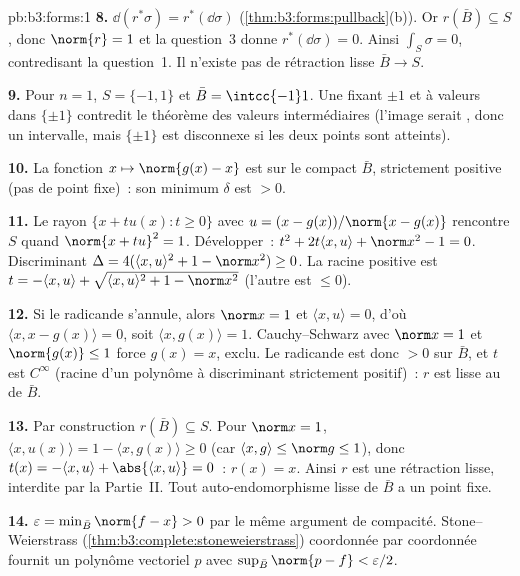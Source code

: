 \begin{solution}{pb:b3:forms:1}
\textbf{8.} $\dd(r^*\sigma) = r^*(\dd\sigma)$
(\cref{thm:b3:forms:pullback}(b)). Or $r(\bar B) \subseteq
S$, donc $\norm{r} = 1$ et la question~3 donne
$r^*(\dd\sigma) = 0$. Ainsi $\int_S\sigma = 0$, contredisant
la question~1. Il n'existe pas de rétraction lisse $\bar B
\to S$.

\textbf{9.} Pour $n = 1$, $S = \{-1,1\}$ et $\bar B =
\intcc{-1}1$. Une  fixant $\pm1$ et à
valeurs dans $\{\pm1\}$ contredit le théorème des valeurs
intermédiaires (l'image serait , donc un intervalle,
mais $\{\pm1\}$ est disconnexe si les deux points sont
atteints).

\textbf{10.} La fonction $x \mapsto \norm{g(x) - x}$ est
 sur le compact $\bar B$, strictement positive (pas
de point fixe)~: son minimum $\delta$ est $> 0$.

\textbf{11.} Le rayon $\{x + t u(x) : t \geq 0\}$ avec $u
= (x-g(x))/\norm{x-g(x)}$ rencontre $S$ quand $\norm{x +
tu}^2 = 1$. Développer~: $t^2 + 2t\langle x,u\rangle +
\norm x^2 - 1 = 0$. Discriminant $\Delta = 4(\langle x,u
\rangle^2 + 1 - \norm x^2) \geq 0$. La racine positive est
$t = -\langle x,u\rangle + \sqrt{\langle x,u\rangle^2 + 1
- \norm x^2}$ (l'autre est $\leq 0$).

\textbf{12.} Si le radicande s'annule, alors $\norm x = 1$
et $\langle x,u\rangle = 0$, d'où $\langle x, x-g(x)\rangle
= 0$, soit $\langle x,g(x)\rangle = 1$. Cauchy--Schwarz
avec $\norm x = 1$ et $\norm{g(x)} \leq 1$ force $g(x) =
x$, exclu. Le radicande est donc $> 0$ sur $\bar B$, et $t$
est $C^\infty$ (racine d'un polynôme à discriminant
strictement positif)~: $r$ est lisse au  de $\bar
B$.

\textbf{13.} Par construction $r(\bar B) \subseteq S$. Pour
$\norm x = 1$, $\langle x, u(x)\rangle = 1 - \langle x,
g(x)\rangle \geq 0$ (car $\langle x,g\rangle \leq \norm
g \leq 1$), donc $t(x) = -\langle x,u\rangle +
\abs{\langle x,u\rangle} = 0$~: $r(x) = x$. Ainsi $r$ est
une rétraction lisse, interdite par la Partie~II. Tout
auto-endomorphisme lisse de $\bar B$ a un point fixe.

\textbf{14.} $\varepsilon = \min_{\bar B}\norm{f-x} > 0$
par le même argument de compacité. Stone--Weierstrass
(\cref{thm:b3:complete:stoneweierstrass}) coordonnée par
coordonnée fournit un polynôme vectoriel $p$ avec
$\sup_{\bar B}\norm{p-f} < \varepsilon/2$.


\end{solution}
